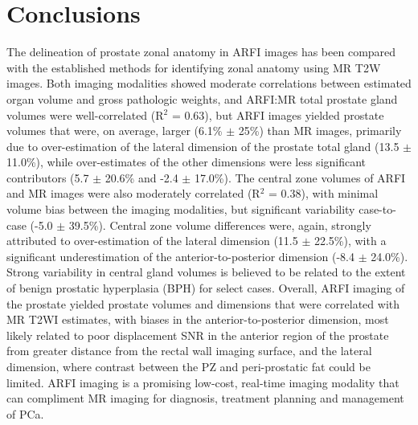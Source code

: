 \section{Conclusions}
The delineation of prostate zonal anatomy in ARFI images has been compared with
the established methods for identifying zonal anatomy using MR T2W images.
Both imaging modalities showed moderate correlations between estimated organ
volume and gross pathologic weights, and ARFI:MR total prostate gland volumes
were well-correlated (R$^2$ = 0.63), but ARFI images yielded prostate volumes
that were, on average, larger (6.1\% $\pm$ 25\%) than MR images, primarily due
to over-estimation of the lateral dimension of the prostate total gland (13.5
$\pm$ 11.0\%), while over-estimates of the other dimensions were less
significant contributors (5.7 $\pm$ 20.6\% and -2.4 $\pm$ 17.0\%).  The central
zone volumes of ARFI and MR images were also moderately correlated (R$^2$ =
0.38), with minimal volume bias between the imaging modalities, but significant
variability case-to-case (-5.0 $\pm$ 39.5\%).  Central zone volume differences
were, again, strongly attributed to over-estimation of the lateral dimension
(11.5 $\pm$ 22.5\%), with a significant underestimation of the
anterior-to-posterior dimension (-8.4 $\pm$ 24.0\%).  Strong variability in
central gland volumes is believed to be related to the extent of benign
prostatic hyperplasia (BPH) for select cases.  Overall, ARFI imaging of the
prostate yielded prostate volumes and dimensions that were correlated with MR
T2WI estimates, with biases in the anterior-to-posterior dimension, most likely
related to poor displacement SNR in the anterior region of the prostate from
greater distance from the rectal wall imaging surface, and the lateral
dimension, where contrast between the PZ and peri-prostatic fat could be
limited.  ARFI imaging is a promising low-cost, real-time imaging modality that
can compliment MR imaging for diagnosis, treatment planning and management of
PCa.
